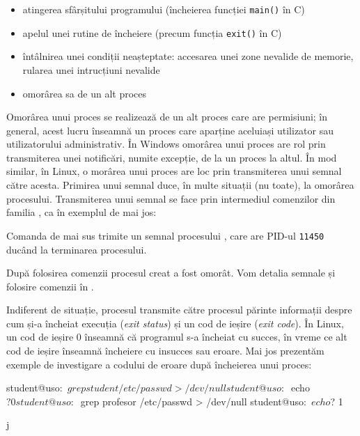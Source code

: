 \begin{itemize}
  \item atingerea sfârșitului programului (încheierea funcției \texttt{main()} în
		C)
              \item apelul unei rutine de încheiere (precum funcția \texttt{exit()} în C)
	\item întâlnirea unei condiții neașteptate: accesarea unei zone nevalide
		de memorie, rularea unei intrucțiuni nevalide
	\item omorârea sa de un alt proces
\end{itemize}

Omorârea unui proces se realizează de un alt proces care are permisiuni; în
general, acest lucru înseamnă un proces care aparține aceluiași utilizator sau
utilizatorului administrativ. În Windows omorârea unui proces are rol prin
transmiterea unei notificări, numite excepție, de la un proces la altul. În mod
similar, în Linux, o morârea unui proces are loc prin transmiterea unui semnal
către acesta. Primirea unui semnal duce, în multe situații (nu toate), la
omorârea procesului. Transmiterea unui semnal se face prin intermediul
comenzilor din familia , ca în exemplul de mai jos:


Comanda  de mai sus trimite un semnal procesului , care are PID-ul \texttt{11450} ducând la terminarea procesului.

După folosirea comenzii  procesul creat a fost omorât. Vom detalia semnale
și folosire comenzii  în
.

Indiferent de situație, procesul transmite către procesul părinte informații
despre cum și-a încheiat execuția (\textit{exit status}) și un cod de ieșire
(\textit{exit code}). În Linux, un cod de ieșire 0 înseamnă că programul s-a
încheiat cu succes, în vreme ce alt cod de ieșire înseamnă încheiere cu insucces
sau eroare. Mai jos prezentăm exemple de investigare a codului de eroare după
încheierea unui proces:

\begin{screen}
student@uso:~$ grep student /etc/passwd > /dev/null
student@uso:~$ echo $?
0
student@uso:~$ grep profesor /etc/passwd > /dev/null
student@uso:~$ echo $?
1
\end{screen}j

